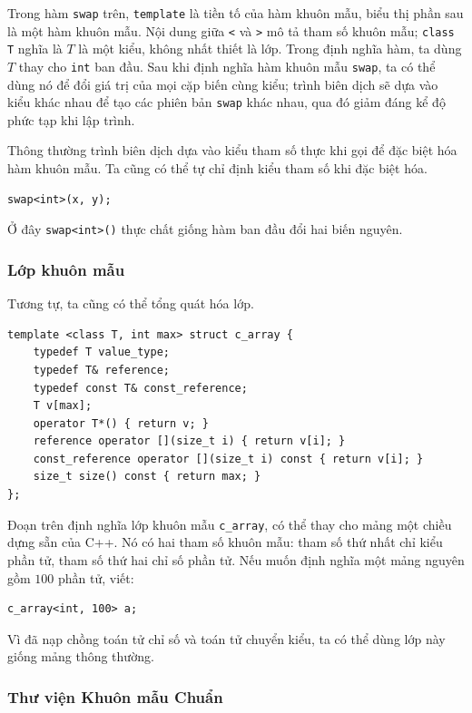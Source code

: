 \documentclass[11pt]{article}
\newcommand{\cpp}{C++}
\begin{document}
Trong hàm \verb|swap| trên, \verb|template| là tiền tố của hàm khuôn mẫu,
biểu thị phần sau là một hàm khuôn mẫu. Nội dung giữa \verb|<| và \verb|>|
mô tả tham số khuôn mẫu; \verb|class T| nghĩa là \(T\) là một kiểu, không nhất
thiết là lớp. Trong định nghĩa hàm, ta dùng \(T\) thay cho \verb|int| ban đầu.
Sau khi định nghĩa hàm khuôn mẫu \verb|swap|, ta có thể dùng nó để đổi giá
trị của mọi cặp biến cùng kiểu; trình biên dịch sẽ dựa vào kiểu khác nhau để
tạo các phiên bản \verb|swap| khác nhau, qua đó giảm đáng kể độ phức tạp khi
lập trình.

Thông thường trình biên dịch dựa vào kiểu tham số thực khi gọi để đặc biệt
hóa hàm khuôn mẫu. Ta cũng có thể tự chỉ định kiểu tham số khi đặc biệt hóa.

\begin{verbatim}
swap<int>(x, y);
\end{verbatim}

Ở đây \verb|swap<int>()| thực chất giống hàm ban đầu đổi hai biến nguyên.

\subsubsection*{Lớp khuôn mẫu}

Tương tự, ta cũng có thể tổng quát hóa lớp.

\begin{verbatim}
template <class T, int max> struct c_array {
    typedef T value_type;
    typedef T& reference;
    typedef const T& const_reference;
    T v[max];
    operator T*() { return v; }
    reference operator [](size_t i) { return v[i]; }
    const_reference operator [](size_t i) const { return v[i]; }
    size_t size() const { return max; }
};
\end{verbatim}

Đoạn trên định nghĩa lớp khuôn mẫu \verb|c_array|, có thể thay cho mảng một
chiều dựng sẵn của \cpp{}. Nó có hai tham số khuôn mẫu: tham số thứ nhất chỉ
kiểu phần tử, tham số thứ hai chỉ số phần tử. Nếu muốn định nghĩa một mảng
nguyên gồm \(100\) phần tử, viết:

\begin{verbatim}
c_array<int, 100> a;
\end{verbatim}

Vì đã nạp chồng toán tử chỉ số và toán tử chuyển kiểu, ta có thể dùng lớp này
giống mảng thông thường.

\subsubsection*{Thư viện Khuôn mẫu Chuẩn}
\end{document}
